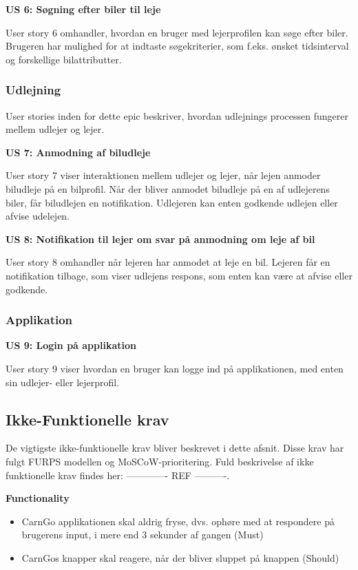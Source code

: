 \documentclass[Rapport/Rapport_main.tex]{subfiles}
\begin{document}
\textbf{US 6: Søgning efter biler til leje}

User story 6 omhandler, hvordan en bruger med lejerprofilen kan søge efter biler. Brugeren har mulighed for at indtaste søgekriterier, som f.eks. ønsket tidsinterval og forskellige bilattributter.  

\subsubsection{Udlejning}
User stories inden for dette epic beskriver, hvordan udlejnings processen fungerer mellem udlejer og lejer.  

\textbf{US 7: Anmodning af biludleje}

User story 7 viser interaktionen mellem udlejer og lejer, når lejen anmoder biludleje på en bilprofil. Når der bliver anmodet biludleje på en af udlejerens biler, får biludlejen en notifikation. Udlejeren kan enten godkende udlejen eller afvise udelejen. 

\textbf{US 8: Notifikation til lejer om svar på anmodning om leje af bil}

User story 8 omhandler når lejeren har anmodet at leje en bil. Lejeren får en notifikation tilbage, som viser udlejens respons, som enten kan være at afvise eller godkende.   

\subsubsection{Applikation}
\textbf{US 9: Login på applikation}

User story 9 viser hvordan en bruger kan logge ind på applikationen, med enten sin udlejer- eller lejerprofil.




\newpage
\subsection{Ikke-Funktionelle krav}

De vigtigste ikke-funktionelle krav bliver beskrevet i dette afsnit. Disse krav har fulgt FURPS modellen og MoSCoW-prioritering. Fuld beskrivelse af ikke funktionelle krav findes her: ------------- REF ----------.


\textbf{Functionality}
\begin{itemize}
    \item CarnGo applikationen skal aldrig fryse, dvs. ophøre med at respondere på brugerens input, i mere end 3 sekunder af gangen (Must)
    \item CarnGos knapper skal reagere, når der bliver sluppet på knappen (Should)
    
\end{itemize}
\end{document}
